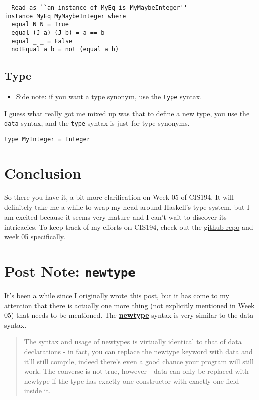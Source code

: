 \documentclass[12pt]{article}
\newcommand{\tightlist}{\setlength{\itemsep}{0pt}\setlength{\parskip}{0pt}}
\begin{document}
\begin{verbatim} 
--Read as ``an instance of MyEq is MyMaybeInteger'' 
instance MyEq MyMaybeInteger where 
  equal N N = True
  equal (J a) (J b) = a == b 
  equal _ _ = False 
  notEqual a b = not (equal a b) 
\end{verbatim}

\subsection{Type}

\begin{itemize}
\tightlist
\item
  Side note: if you want a type synonym, use the \texttt{type} syntax.
\end{itemize}

I guess what really got me mixed up was that to define a new type, you
use the \texttt{data} syntax, and the \texttt{type} syntax is just for
type synonyms.

\begin{verbatim} 
type MyInteger = Integer 
\end{verbatim}

\section{Conclusion}\label{conclusion}

So there you have it, a bit more clarification on Week 05 of CIS194. It
will definitely take me a while to wrap my head around Haskell's type
system, but I am excited because it seems very mature and I can't wait
to discover its intricacies. To keep track of my efforts on CIS194,
check out the \href{https://github.com/2016rshah/CIS194}{github repo}
and \href{https://github.com/2016rshah/CIS194/tree/master/05}{week 05
specifically}.

\section{\texorpdfstring{Post Note:
\texttt{newtype}}{Post Note: newtype}}\label{post-note-newtype}

It's been a while since I originally wrote this post, but it has come to
my attention that there is actually one more thing (not explicitly
mentioned in Week 05) that needs to be mentioned. The
\href{https://wiki.haskell.org/Newtype}{\textbf{newtype}} syntax is very
similar to the data syntax.

\begin{quote}
The syntax and usage of newtypes is virtually identical to that of data
declarations - in fact, you can replace the newtype keyword with data
and it'll still compile, indeed there's even a good chance your program
will still work. The converse is not true, however - data can only be
replaced with newtype if the type has exactly one constructor with
exactly one field inside it.
\end{quote}
\end{document}
